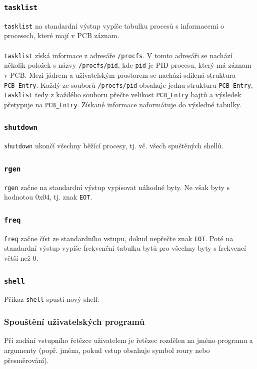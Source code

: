 \documentclass[12pt, a4paper]{article}
\begin{document}
    \subsubsection*{\texttt{tasklist}}
    \texttt{tasklist} na standardní výstup vypíše tabulku procesů s informacemi o procesech, které mají v PCB záznam. 
    \\
    \\
	\texttt{tasklist} získá informace z adresáře \texttt{/procfs}. V tomto adresáři se nachází několik položek s názvy \texttt{/procfs/pid}, kde \texttt{pid} je PID procesu, který má záznam v PCB. Mezi jádrem a uživatelským prostorem se nachází sdílená struktura \texttt{PCB_Entry}. Každý ze souborů \texttt{/procfs/pid} obsahuje jednu strukturu \texttt{PCB_Entry}, \texttt{tasklist} tedy z každého souboru přečte velikost \texttt{PCB_Entry} bajtů a výsledek přetypuje na \texttt{PCB_Entry}. Získané informace naformátuje do výsledné tabulky.
    
    
    \subsubsection*{\texttt{shutdown}}
    \texttt{shutdown} ukončí všechny běžící procesy, tj. vč. všech spuštěných shellů.
    
    \subsubsection*{\texttt{rgen}}
    \texttt{rgen} začne na standardní výstup vypisovat náhodné byty. Ne však byty s hodnotou 0x04, tj. znak \texttt{EOT}.
    
    \subsubsection*{\texttt{freq}}
    \texttt{freq} začne číst ze standardního vstupu, dokud nepřečte znak \texttt{EOT}. Poté na standardní výstup vypíše frekvenční tabulku bytů pro všechny byty s frekvencí větší než 0.
    
    \subsubsection*{\texttt{shell}}
    Příkaz \texttt{shell} spustí nový shell.
	
	
	\subsubsection{Spouštění uživatelských programů}
	Při zadání vstupního řetězce uživatelem je řetězec rozdělen na jméno programu a argumenty (popř. jména, pokud vstup obsahuje symbol roury nebo přesměrování).	
	
\end{document}
